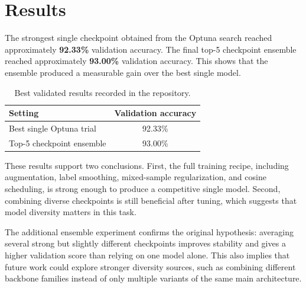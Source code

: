 \documentclass[11pt]{article}
\begin{document}
\section{Results}
The strongest single checkpoint obtained from the Optuna search reached approximately \textbf{92.33\%} validation accuracy. The final top-5 checkpoint ensemble reached approximately \textbf{93.00\%} validation accuracy. This shows that the ensemble produced a measurable gain over the best single model.

\begin{table}[h]
\centering
\begin{tabular}{lc}
\toprule
Setting & Validation accuracy \\
\midrule
Best single Optuna trial & 92.33\% \\
Top-5 checkpoint ensemble & 93.00\% \\
\bottomrule
\end{tabular}
\caption{Best validated results recorded in the repository.}
\end{table}

These results support two conclusions. First, the full training recipe, including augmentation, label smoothing, mixed-sample regularization, and cosine scheduling, is strong enough to produce a competitive single model. Second, combining diverse checkpoints is still beneficial after tuning, which suggests that model diversity matters in this task.

The additional ensemble experiment confirms the original hypothesis: averaging several strong but slightly different checkpoints improves stability and gives a higher validation score than relying on one model alone. This also implies that future work could explore stronger diversity sources, such as combining different backbone families instead of only multiple variants of the same main architecture.
\end{document}
